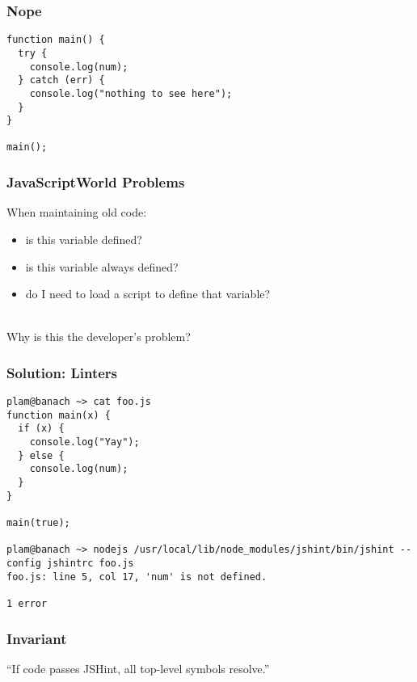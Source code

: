 \documentclass{beamer}
\newenvironment{changemargin}[1]{%
  \begin{list}{}{%
    \setlength{\topsep}{0pt}%
    \setlength{\leftmargin}{#1}%
    \setlength{\rightmargin}{1em}
    \setlength{\listparindent}{\parindent}%
    \setlength{\itemindent}{\parindent}%
    \setlength{\parsep}{\parskip}%
  }%
  \item[]}{\end{list}}
\begin{document}
\begin{frame}[fragile]
\frametitle{Nope}
\begin{changemargin}{2cm}
\begin{lstlisting}
function main() {
  try {
    console.log(num);
  } catch (err) {
    console.log("nothing to see here");
  }
}

main();
\end{lstlisting}
\end{changemargin}
\end{frame}

\begin{frame}
\frametitle{JavaScriptWorld Problems}
\begin{changemargin}{2cm}
When maintaining old code:
\begin{itemize}
\item is this variable defined?
\item is this variable always defined?
\item do I need to load a script to define that variable?
\end{itemize}
~\\[1em]
Why is this the developer's problem?
\end{changemargin}
\end{frame}


\begin{frame}[fragile]
\frametitle{Solution: Linters}
\begin{changemargin}{0cm}

\begin{lstlisting}
plam@banach ~> cat foo.js
function main(x) {
  if (x) {
    console.log("Yay");
  } else {
    console.log(num);
  }
}

main(true);

plam@banach ~> nodejs /usr/local/lib/node_modules/jshint/bin/jshint --config jshintrc foo.js
foo.js: line 5, col 17, 'num' is not defined.

1 error
\end{lstlisting}
\end{changemargin}
\end{frame}

\begin{frame}
\frametitle{Invariant}

\begin{center}
``If code passes JSHint, all top-level symbols resolve.''
\end{center}
\end{frame}
\end{document}
